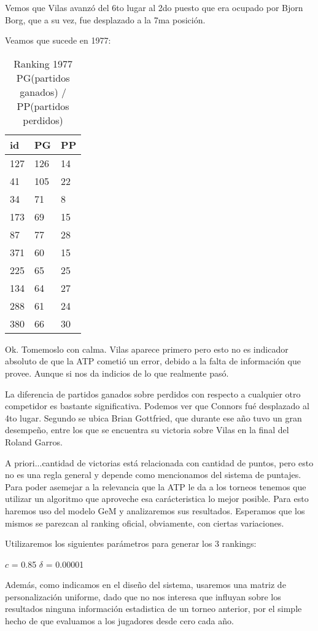 Vemos que Vilas avanzó del 6to lugar al 2do puesto que era ocupado por Bjorn Borg, que a su vez, fue desplazado a la 7ma posición.

Veamos que sucede en 1977:

\begin{table}[H]
\label{my-label}
\begin{tabular}{lll}
\hline
id  & PG & PP \\ \hline
127 & 126 & 14 \\
41 & 105 & 22 \\
34 & 71 & 8 \\
173 & 69 & 15 \\
87 & 77 & 28 \\
371 & 60 & 15 \\
225 & 65 & 25 \\
134 & 64 & 27 \\
288 & 61 & 24 \\
380 & 66 & 30 \\ \hline 
\end{tabular}
\centering
\caption{Ranking 1977 PG(partidos ganados) / PP(partidos perdidos)}
\end{table}

Ok. Tomemoslo con calma. Vilas aparece primero pero esto no es indicador absoluto de que la ATP cometió un error, debido a la falta de información que provee. Aunque si nos da indicios de lo que realmente pasó.

La diferencia de partidos ganados sobre perdidos con respecto a cualquier otro competidor es bastante significativa. Podemos ver que Connors fué desplazado al 4to lugar. Segundo se ubica Brian Gottfried, que durante ese año tuvo un gran desempeño, entre los que se encuentra su victoria sobre Vilas en la final del Roland Garros. 

A priori...cantidad de victorias está relacionada con cantidad de puntos, pero esto no es una regla general y depende como mencionamos del sistema de puntajes. Para poder asemejar a la relevancia que la ATP le da a los torneos tenemos que utilizar un algoritmo que aproveche esa carácteristica lo mejor posible. Para esto haremos uso del modelo GeM y analizaremos sus resultados. Esperamos que los mismos se parezcan al ranking oficial, obviamente, con ciertas variaciones.

Utilizaremos los siguientes parámetros para generar los 3 rankings:

$c$ = 0.85
$\delta$ = 0.00001

Además, como indicamos en el diseño del sistema, usaremos una matriz de personalización uniforme, dado que no nos interesa que influyan sobre los resultados ninguna información estadistica de un torneo anterior, por el simple hecho de que evaluamos a los jugadores desde cero cada año.

